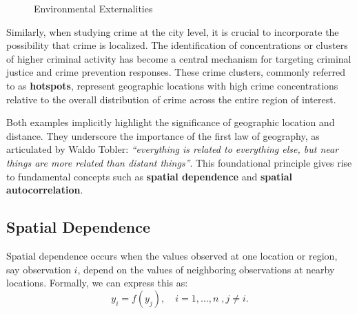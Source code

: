 \documentclass[english,12pt]{book}\usepackage[]{graphicx}\usepackage[]{xcolor}
\begin{document}
\begin{figure}[h]
\caption{Environmental Externalities}
\label{fig:example_poll}
\centering
{}
\end{figure}

Similarly, when studying crime at the city level, it is crucial to incorporate the possibility that crime is localized. The identification of concentrations or clusters of higher criminal activity has become a central mechanism for targeting criminal justice and crime prevention responses. These crime clusters, commonly referred to as \textbf{hotspots}, represent geographic locations with high crime concentrations relative to the overall distribution of crime across the entire region of interest.

Both examples implicitly highlight the significance of geographic location and distance. They underscore the importance of the first law of geography, as articulated by Waldo Tobler: \emph{``everything is related to everything else, but near things are more related than distant things''}. This foundational principle gives rise to fundamental concepts such as \textbf{spatial dependence} and \textbf{spatial autocorrelation}.

\subsection{Spatial Dependence}\label{sec:spatial_dependence}

Spatial dependence occurs when the values observed at one location or region, say observation $i$, depend on the values of neighboring observations at nearby locations. Formally, we can express this as:
\begin{equation*}
  y_i = f(y_j),\quad i = 1,\ldots,n\;, j\neq i.
\end{equation*}
\end{document}
